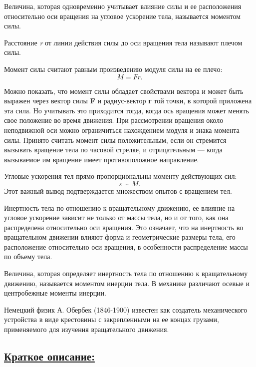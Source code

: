 \documentclass[14pt,a4paper,oneside]{extarticle}	%
\begin{document}
	Величина, которая одновременно учитывает влияние силы и ее 
	расположения относительно оси вращения на угловое ускорение 
	тела, называется моментом силы. 
	
	Расстояние \textit{r} от линии действия силы до оси вращения тела называют плечом силы. 
	
	Момент силы считают равным произведению модуля силы на ее плечо: $$ M=Fr. $$
	
	Можно показать, что момент силы обладает свойствами вектора и может быть выражен через 
	вектор силы \textbf{F} и радиус-вектор 	\textbf{г} той точки, в которой приложена эта сила. 
	Но учитывать это приходится тогда, когда ось вращения может менять свое положение во время движения.
	При рассмотрении вращения около неподвижной оси можно ограничиться нахождением модуля 
	и знака момента силы.
	Принято считать момент силы положительным, если он стремится вызывать вращение тела по часовой стрелке, и отрицательным — когда вызываемое им вращение имеет противоположное направление. 
	
	Угловые ускорения тел прямо пропорциональны моменту действующих сил: $$ \varepsilon \sim M. $$
	Этот важный вывод подтверждается множеством опытов с вращением тел.
	
	Инертность тела по отношению к вращательному движению, ее влияние на угловое ускорение зависит не только от массы тела, но и от того, как она распределена относительно оси вращения. 
	Это означает, что на инертность во вращательном движении влияют форма и геометрические размеры тела, его расположение относительно оси вращения, в особенности распределение массы по объему тела. 
	
	Величина, которая определяет инертность тела по отношению к вращательному движению, называется моментом инерции тела.
	В механике различают осевые и центробежные моменты инерции. 
	
	Немецкий физик А. Обербек (1846-1900) известен как создатель механического устройства в виде крестовины с закрепленными на ее концах грузами, применяемого для изучения вращательного движения.

	\newpage	
		\subsection*{\underline{Краткое описание:}}
		
\end{document}
